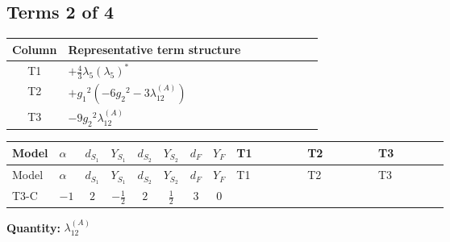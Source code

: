 \documentclass[8pt]{article}
\begin{document}
\begin{landscape}
\subsection*{Terms 2 of 4}
\begin{center}
\begin{tabular}{@{}c >{\raggedright\arraybackslash}p{0.82\linewidth}@{}}
\toprule
Column & Representative term structure \\
\midrule
T1 & \(\displaystyle +\frac{4}{3} {\lambda_5} \left({\lambda_5}\right)^{*}\) \\
\midrule
T2 & \(\displaystyle +{g_1}^2 \left(-6 {g_2}^2-3 {\lambda_{12}^{(A)}}\right)\) \\
\midrule
T3 & \(\displaystyle -9 {g_2}^2 {\lambda_{12}^{(A)}}\) \\
\midrule
\bottomrule
\end{tabular}
\end{center}
\smallskip
\tiny
\begin{longtable}{@{}llcccccc >{\raggedright\arraybackslash}p{0.21\linewidth} >{\raggedright\arraybackslash}p{0.21\linewidth} >{\raggedright\arraybackslash}p{0.21\linewidth}@{}}
\toprule
Model & $\alpha$ & $d_{S_1}$ & $Y_{S_1}$ & $d_{S_2}$ & $Y_{S_2}$ & $d_F$ & $Y_F$ & T1 & T2 & T3 \\
\midrule
\endfirsthead
\toprule
Model & $\alpha$ & $d_{S_1}$ & $Y_{S_1}$ & $d_{S_2}$ & $Y_{S_2}$ & $d_F$ & $Y_F$ & T1 & T2 & T3 \\
\midrule
\endhead
T3-C & $-1$ & $2$ & $-\frac{1}{2}$ & $2$ & $\frac{1}{2}$ & $3$ & $0$ & \scriptsize\adjustbox{max width=\linewidth}{$\begin{gathered} +\frac{4}{3} {\lambda_5} \left({\lambda_5}\right)^{*}\end{gathered}$} & \scriptsize\adjustbox{max width=\linewidth}{$\begin{gathered} +{g_1}^2 \left(-6 {g_2}^2-3 {\lambda_{12}^{(A)}}\right)\end{gathered}$} & \scriptsize\adjustbox{max width=\linewidth}{$\begin{gathered} -9 {g_2}^2 {\lambda_{12}^{(A)}}\end{gathered}$} \\
\midrule
\bottomrule
\end{longtable}
\clearpage
\noindent\textbf{Quantity: }$\lambda_{12}^{(A)}$\par\smallskip

\end{landscape}
\end{document}
